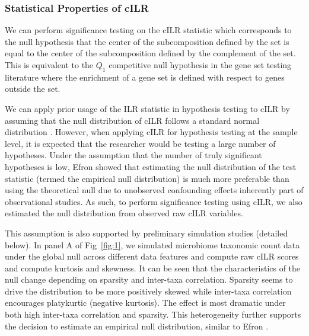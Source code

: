 \documentclass[10pt,letterpaper]{article}
\begin{document}
\subsubsection*{Statistical Properties of cILR}
We can perform significance testing on the cILR statistic which corresponds to the null hypothesis that the center of the subcomposition defined by the set is equal to the center of the subcomposition defined by the complement of the set. This is equivalent to the $Q_1$ competitive null hypothesis in the gene set testing literature \cite{tian2005} where the enrichment of a gene set is defined with respect to genes outside the set. 

We can apply prior usage of the ILR statistic in hypothesis testing to cILR by assuming that the null distribution of cILR follows a standard normal distribution \cite{egozcue2005}. However, when applying cILR for hypothesis testing at the sample level, it is expected that the researcher would be testing a large number of hypotheses. Under the assumption that the number of truly significant hypotheses is low, Efron \cite{efron2004} showed that estimating the null distribution of the test statistic (termed the empirical null distribution) is much more preferable than using the theoretical null due to unobserved confounding effects inherently part of observational studies. As such, to perform significance testing using cILR, we also estimated the null distribution from observed raw cILR variables. 

This assumption is also supported by preliminary simulation studies (detailed below). In panel A of Fig~\ref{fig:1}, we simulated microbiome taxonomic count data under the global null across different data features and compute raw cILR scores and compute kurtosis and skewness. It can be seen that the characteristics of the null change depending on sparsity and inter-taxa correlation. Sparsity seems to drive the distribution to be more positively skewed while inter-taxa correlation encourages platykurtic (negative kurtosis). The effect is most dramatic under both high inter-taxa correlation and sparsity. This heterogeneity further supports the decision to estimate an empirical null distribution, similar to Efron \cite{efron2004}. 
\end{document}
